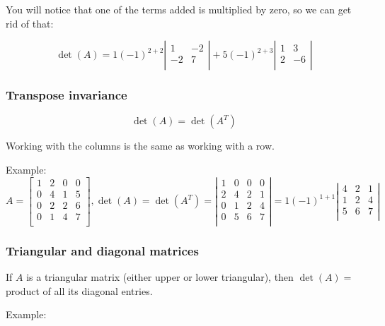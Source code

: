 \documentclass[
]{article}
\begin{document}
You will notice that one of the terms added is multiplied by zero, so we
can get rid of that:

$$\det(A) = 1( - 1)^{2 + 2}\left| \begin{matrix}
1 & - 2 \\
 - 2 & 7 \\
\end{matrix} \right| + 5( - 1)^{2 + 3}\left| \begin{matrix}
1 & 3 \\
2 & - 6 \\
\end{matrix} \right|$$


\subsubsection{Transpose invariance}

$$\det(A) = \det\left( A^{T} \right)$$

Working with the columns is the same as working with a row.

Example: $A = \begin{bmatrix}
1 & 2 & 0 & 0 \\
0 & 4 & 1 & 5 \\
0 & 2 & 2 & 6 \\
0 & 1 & 4 & 7 \\
\end{bmatrix},\det(A) = \det\left( A^{T} \right) = \left| \begin{matrix}
1 & 0 & 0 & 0 \\
2 & 4 & 2 & 1 \\
0 & 1 & 2 & 4 \\
0 & 5 & 6 & 7 \\
\end{matrix} \right| = 1( - 1)^{1 + 1}\left| \begin{matrix}
4 & 2 & 1 \\
1 & 2 & 4 \\
5 & 6 & 7 \\
\end{matrix} \right|$


\subsubsection{Triangular and diagonal
matrices}

If $A$ is a triangular matrix (either upper or lower triangular), then
$\det(A) =$ product of all its diagonal entries.

Example:
\end{document}
